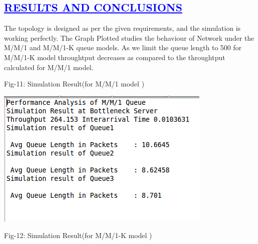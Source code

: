 \documentclass[a4paper,12pt]{report}
\begin{document}
\begin{center}
\chapter{\textcolor{blue}{\underline {RESULTS AND CONCLUSIONS}}}\end{center}
\noindent The topology is designed as per the given requirements, and the simulation is working perfectly. The Graph Plotted studies the behaviour of Network under 
	  the M/M/1 and M/M/1-K queue models. As we limit the queue length to 500 for M/M/1-K model throughtput decreases as compared to the 
	  throughtput calculated for M/M/1 model.

\noindent Fig-11: Simulation Result(for M/M/1 model )\\
\begin{center}
 \includegraphics[width=12 cm,height=12 cm]{./result.png}
\end{center}
\noindent Fig-12: Simulation Result(for M/M/1-K model )\\
\end{document}
